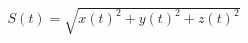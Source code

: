 \documentclass[preview]{standalone}
\begin{document}
\begin{align*}
S(t) = \sqrt{ x(t)^2  +  y(t)^2  +  z(t)^2 }
\end{align*}
\end{document}
